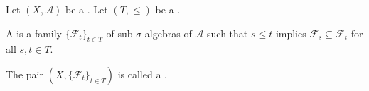 \begin{definition} \label{definition:filtration_on_a_measurable_space}
Let $(X, \mathcal{A})$ be a . Let $(T, \leq)$ be a . 

A  is a family $\{\mathcal{F}_t\}_{t \in T}$ of sub-$\sigma$-algebras of $\mathcal{A}$ such that $s \leq t$ implies $\mathcal{F}_s \subseteq \mathcal{F}_t$ for all $s, t \in T$.

The pair $(X, \{\mathcal{F}_t\}_{t \in T})$ is called a .
\end{definition}
